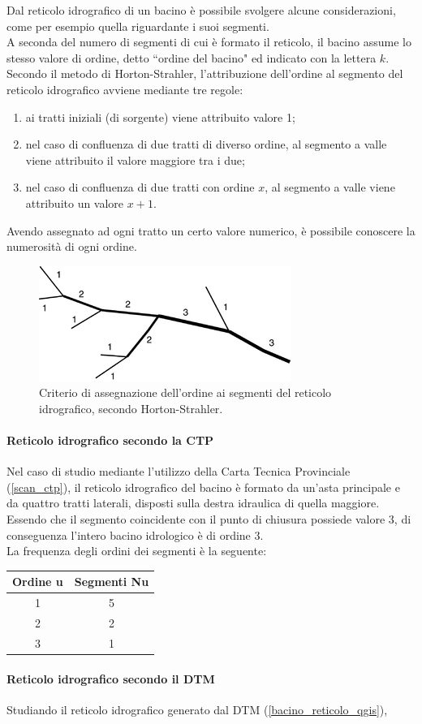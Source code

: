 \noindent Dal reticolo idrografico di un bacino è possibile svolgere alcune considerazioni, come per esempio quella riguardante i suoi segmenti.\\
A seconda del numero di segmenti di cui è formato il reticolo, il bacino assume lo stesso valore di ordine, detto ``ordine del bacino" ed indicato con la lettera $k$.\\
Secondo il metodo di Horton-Strahler, l'attribuzione dell'ordine al segmento del reticolo idrografico avviene mediante tre regole: 
\begin{enumerate}
    \item ai tratti iniziali (di sorgente) viene attribuito valore 1;
    \item nel caso di confluenza di due tratti di diverso ordine, al segmento a valle viene attribuito il valore maggiore tra i due;
    \item nel caso di confluenza di due tratti con ordine $x$, al segmento a valle viene attribuito un valore $x+1$.
\end{enumerate} 
Avendo assegnato ad ogni tratto un certo valore numerico, è possibile conoscere la numerosità di ogni ordine.
\begin{figure}[H]\centering
    \includegraphics[scale=.75]{immagini/ordine_horton.png}
    \caption{Criterio di assegnazione dell'ordine ai segmenti del reticolo idrografico, secondo Horton-Strahler.}
  \label{ordine_horton}
\end{figure}
 
\paragraph{Reticolo idrografico secondo la CTP}
Nel caso di studio mediante l'utilizzo della Carta Tecnica Provinciale (\ref{scan_ctp}), il reticolo idrografico del bacino è formato da un'asta principale e da quattro tratti laterali, disposti sulla destra idraulica di quella maggiore.\\
Essendo che il segmento coincidente con il punto di chiusura possiede valore 3, di conseguenza l'intero bacino idrologico è di ordine 3.\\
La frequenza degli ordini dei segmenti è la seguente:
\begin{table}[H] \centering
    \begin{tabular}{cc}
\toprule
    Ordine u & Segmenti Nu \\
\midrule    
    1        & 5           \\
    2        & 2           \\
    3        & 1           \\
\bottomrule    
\end{tabular}
\end{table}
\paragraph{Reticolo idrografico secondo il DTM}
Studiando il reticolo idrografico generato dal DTM (\ref{bacino_reticolo_qgis}), 